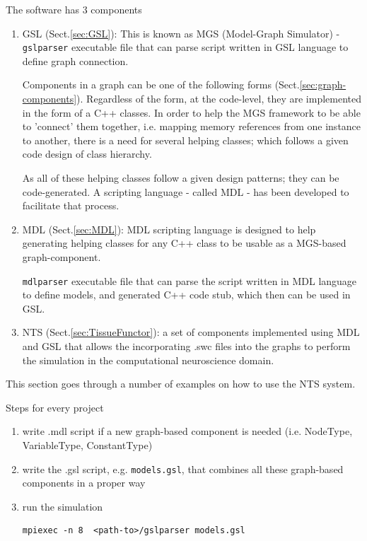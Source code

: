 The software has 3 components
\begin{enumerate}
  \item GSL (Sect.\ref{sec:GSL}): 
  This is known as MGS (Model-Graph Simulator) - \verb!gslparser! executable
  file that can parse script written in GSL language to define graph
  connection.
  
  Components in a graph can be one of the following forms (Sect.\ref{sec:graph-components}).
  Regardless of the form, at the code-level, they are implemented in the form of
  a C++ classes. In order to help the MGS framework to be able to 'connect' them
  together, i.e. mapping memory references from one instance to another,
  there is a need for several helping classes; which follows a given code
  design of class hierarchy.
  
  As all of these helping classes follow a given design patterns; they can be
  code-generated. A scripting language - called MDL - has been developed to
  facilitate that process.
  
  \item MDL (Sect.\ref{sec:MDL}): MDL scripting language is designed to help
  generating helping classes for any C++ class to be usable as a
  MGS-based graph-component.
  
  \verb!mdlparser! executable   file that can parse the script written in MDL
  language to define models, and generated C++ code stub, which then can be used
  in GSL.
  
  
  \item NTS (Sect.\ref{sec:TissueFunctor}): a set of components implemented
  using MDL and GSL that allows the incorporating .swc files into the graphs
  to perform the simulation in the computational neuroscience domain.

\end{enumerate}


This section goes through a number of examples on how to use the
NTS system.

Steps for every project
\begin{enumerate}
  \item write .mdl script if a new graph-based component is needed (i.e.
  NodeType, VariableType, ConstantType)
  
  \item write the .gsl script, e.g. \verb!models.gsl!, that combines all these
  graph-based components in a proper way
  
  \item run the simulation
\begin{verbatim}
mpiexec -n 8  <path-to>/gslparser models.gsl
\end{verbatim}

\end{enumerate}


